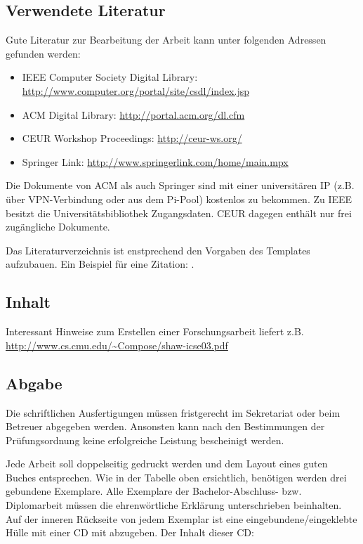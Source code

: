 \subsection{Verwendete Literatur}

Gute Literatur zur Bearbeitung der Arbeit kann unter folgenden Adressen gefunden werden:

\begin{itemize}
\item IEEE Computer Society Digital Library: \url{http://www.computer.org/portal/site/csdl/index.jsp}
\item ACM Digital Library: \url{http://portal.acm.org/dl.cfm}
\item CEUR Workshop Proceedings: \url{http://ceur-ws.org/}
\item Springer Link: \url{http://www.springerlink.com/home/main.mpx}
\end{itemize}

Die Dokumente von ACM als auch Springer sind mit einer universitären IP (z.B. über VPN-Verbindung oder aus dem Pi-Pool) kostenlos zu bekommen. Zu IEEE besitzt die Universitätsbibliothek Zugangsdaten. CEUR dagegen enthält nur frei zugängliche Dokumente.

Das Literaturverzeichnis ist enstprechend den Vorgaben des Templates aufzubauen. Ein Beispiel f\"ur eine Zitation: \cite{tannenbaum}.

\subsection{Inhalt}

Interessant Hinweise zum Erstellen einer Forschungsarbeit liefert z.B. \url{http://www.cs.cmu.edu/~Compose/shaw-icse03.pdf}

\subsection{Abgabe}

Die schriftlichen Ausfertigungen müssen fristgerecht im Sekretariat oder beim Betreuer abgegeben werden. Ansonsten kann nach den Bestimmungen der Prüfungsordnung keine erfolgreiche Leistung bescheinigt werden. 

Jede Arbeit soll doppelseitig gedruckt werden und dem Layout eines guten
Buches entsprechen. Wie in der Tabelle oben ersichtlich, benötigen werden drei gebundene Exemplare. Alle Exemplare der Bachelor-Abschluss- bzw. Diplomarbeit müssen die ehrenwörtliche Erklärung unterschrieben beinhalten. Auf der inneren Rückseite von jedem Exemplar ist eine eingebundene/eingeklebte Hülle mit einer CD mit abzugeben. Der Inhalt dieser CD:

